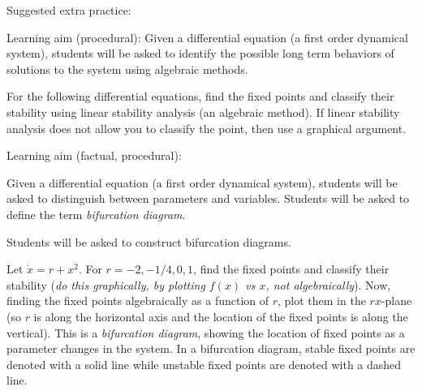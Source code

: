 \documentclass[12pt,letterpaper,noanswers]{exam}
\begin{document}
\eject

Suggested extra practice:

\begin{questions}
\question 
\begin{tcolorbox}
Learning aim (procedural): Given a differential equation (a first order dynamical system), students will be asked to identify the possible long term behaviors of solutions to the system using algebraic methods.
\end{tcolorbox}

For the following differential equations, find the fixed points and classify their stability using linear stability analysis (an algebraic method).  If linear stability analysis does not allow you to classify the point, then use a graphical argument.



\question


\begin{tcolorbox}
Learning aim (factual, procedural): 


 Given a differential equation (a first order dynamical system), students will be asked to distinguish between parameters and variables.  Students will be asked to define the term \emph{bifurcation diagram}. 
    
    Students will be asked to construct bifurcation diagrams.
\end{tcolorbox}

Let $\dot{x} = r + x^2$.  For $r = -2, -1/4, 0, 1$, find the fixed points and classify their stability ({\it{do this graphically, by plotting $f(x)$ vs $x$, not algebraically}}).  Now, finding the fixed points algebraically as a function of $r$, plot them in the $rx$-plane (so $r$ is along the horizontal axis and the location of the fixed points is along the vertical).  This is a {\it{bifurcation diagram}}, showing the location of fixed points as a parameter changes in the system.  In a bifurcation diagram, stable fixed points are denoted with a solid line while unstable fixed points are denoted with a dashed line.


\end{questions}
\end{document}
